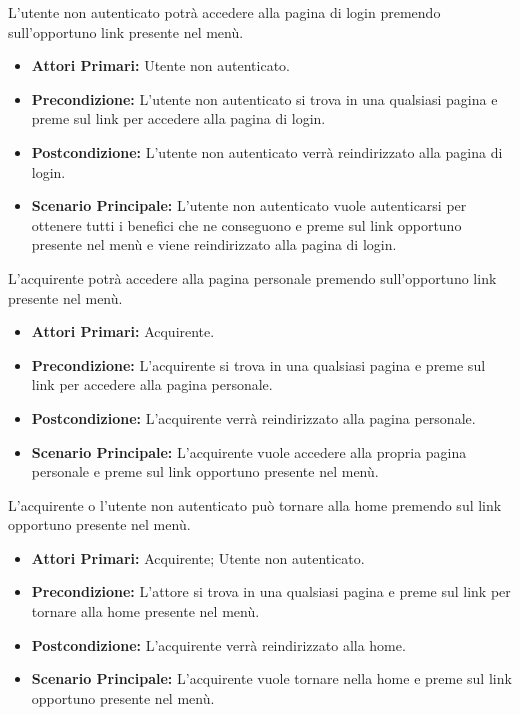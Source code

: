 
L'utente non autenticato potrà accedere alla pagina di login premendo sull'opportuno link presente nel menù.
\begin{itemize}
    \item \textbf{Attori Primari:} Utente non autenticato.
    \item \textbf{Precondizione:} L'utente non autenticato si trova in una qualsiasi pagina e preme sul link per accedere alla pagina di login.
    \item \textbf{Postcondizione:} L'utente non autenticato verrà reindirizzato alla pagina di login.
    \item \textbf{Scenario Principale:} L'utente non autenticato vuole autenticarsi per ottenere tutti i benefici che ne conseguono e preme sul link opportuno presente nel menù e viene reindirizzato alla pagina di login. 
\end{itemize}

L'acquirente potrà accedere alla pagina personale premendo sull'opportuno link presente nel menù.
\begin{itemize}
    \item \textbf{Attori Primari:} Acquirente.
    \item \textbf{Precondizione:} L'acquirente si trova in una qualsiasi pagina e preme sul link per accedere alla pagina personale.
    \item \textbf{Postcondizione:} L'acquirente verrà reindirizzato alla pagina personale.
    \item \textbf{Scenario Principale:} L'acquirente  vuole accedere alla propria pagina personale e preme sul link opportuno presente nel menù.
\end{itemize}

L'acquirente o l'utente non autenticato può tornare alla home premendo sul link opportuno presente nel menù.
\begin{itemize}
    \item \textbf{Attori Primari:} Acquirente; Utente non autenticato.
    \item \textbf{Precondizione:} L'attore si trova in una qualsiasi pagina e preme sul link per tornare alla home presente nel menù.
    \item \textbf{Postcondizione:} L'acquirente verrà reindirizzato alla home.
    \item \textbf{Scenario Principale:} L'acquirente vuole tornare nella home e preme sul link opportuno presente nel menù.
\end{itemize}

